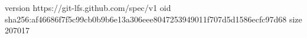 version https://git-lfs.github.com/spec/v1
oid sha256:af46686f7f5c99cb0b9b6e13a306eee8047253949011f707d5d1586ecfc97d68
size 207017
